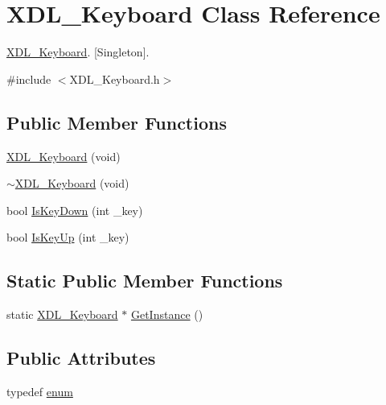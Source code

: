 \hypertarget{class_x_d_l___keyboard}{\section{X\-D\-L\-\_\-\-Keyboard Class Reference}
\label{class_x_d_l___keyboard}
}


\hyperlink{class_x_d_l___keyboard}{X\-D\-L\-\_\-\-Keyboard}. \mbox{[}Singleton\mbox{]}.  




{\ttfamily \#include $<$X\-D\-L\-\_\-\-Keyboard.\-h$>$}

\subsection*{Public Member Functions}
\begin{DoxyCompactItemize}
\item 
\hyperlink{class_x_d_l___keyboard_aa8f740463841d91611b710f0c3dca6ee}{X\-D\-L\-\_\-\-Keyboard} (void)
\item 
\hyperlink{class_x_d_l___keyboard_a3fb30ebca39b9b7fa72c06cb5c226d6c}{$\sim$\-X\-D\-L\-\_\-\-Keyboard} (void)
\item 
bool \hyperlink{class_x_d_l___keyboard_a62edde6c382fcf2861349756e828ffeb}{Is\-Key\-Down} (int \-\_\-key)
\item 
bool \hyperlink{class_x_d_l___keyboard_ae138fd6724656cfb3400537d89f2d58b}{Is\-Key\-Up} (int \-\_\-key)
\end{DoxyCompactItemize}
\subsection*{Static Public Member Functions}
\begin{DoxyCompactItemize}
\item 
static \hyperlink{class_x_d_l___keyboard}{X\-D\-L\-\_\-\-Keyboard} $\ast$ \hyperlink{class_x_d_l___keyboard_a16a920318c7e216d9896cd38ca137751}{Get\-Instance} ()
\end{DoxyCompactItemize}
\subsection*{Public Attributes}
\begin{DoxyCompactItemize}
\item 
typedef \hyperlink{class_x_d_l___keyboard_ac829d3df1d32d9585b5850a16adc683b}{enum}
\end{DoxyCompactItemize}


